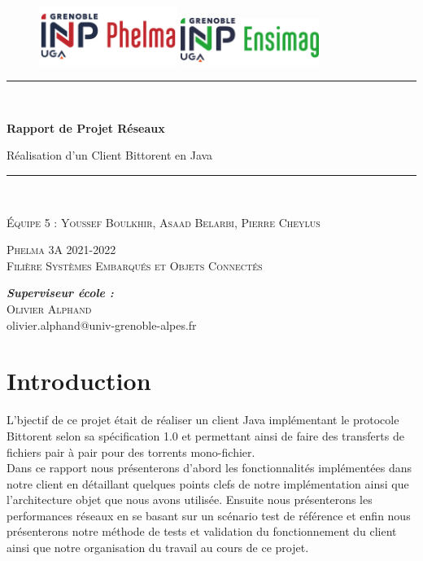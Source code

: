 \documentclass{article}
\begin{document}
\begin{titlepage}

\centering
\begin{figure}
   \includegraphics[width=0.4\textwidth]{logophelma.jpg}
   \hfill
   \includegraphics[width=0.4\textwidth]{logoimag.png}
\end{figure}

\rule{\linewidth}{0.2 mm} \\[0.4 cm]
{\huge\bfseries Rapport de Projet Réseaux \par\vspace{1cm}} 
{\Large Réalisation d'un Client Bittorent en Java} 
\rule{\linewidth}{0.2 mm} \\[1.0 cm]



{\scshape\Large 
Équipe 5 : Youssef Boulkhir, Asaad Belarbi, Pierre Cheylus
\par}
\vspace{1cm}

{\scshape \Large Phelma 3A 2021-2022 \\
Filière Systèmes Embarqués et Objets Connectés \par}
\vspace{7cm}

\begin{flushleft}
\emph{\textbf{Superviseur école :}}\\
\textsc{Olivier Alphand} \\
olivier.alphand@univ-grenoble-alpes.fr\\
\end{flushleft}
\end{titlepage}
\newpage

\tableofcontents
\newpage

\section{Introduction}
L'bjectif de ce projet était de réaliser un client Java implémentant le protocole Bittorent selon sa spécification 1.0 et permettant ainsi de faire des transferts de fichiers pair à pair pour des torrents mono-fichier. \\
Dans ce rapport nous présenterons d'abord les fonctionnalités implémentées dans notre client en détaillant quelques points clefs de notre implémentation ainsi que l'architecture objet que nous avons utilisée. Ensuite nous présenterons les performances réseaux en se basant sur un scénario test de référence et enfin nous présenterons notre méthode de tests et validation du fonctionnement du client ainsi que notre organisation du travail au cours de ce projet. 
\end{document}
